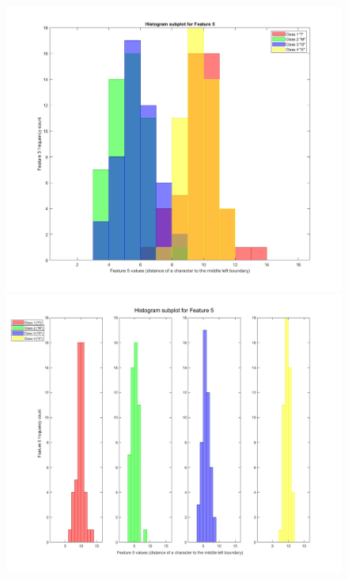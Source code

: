 \documentclass[a4paper,12pt]{article}
\begin{document}
\begin{figure}[H]
\centering
\includegraphics[scale=0.3]{q1pc_5.jpg}
\includegraphics[scale=0.3]{q1pcs_5.jpg}
\end{figure}
\pagebreak
\end{document}
